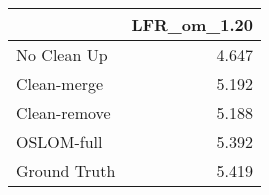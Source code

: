 \begin{tabular}{lr}
\toprule
{} & LFR_om_1.20 \\
\midrule
No Clean Up  &       4.647 \\
Clean-merge  &       5.192 \\
Clean-remove &       5.188 \\
OSLOM-full   &       5.392 \\
Ground Truth &       5.419 \\
\bottomrule
\end{tabular}
